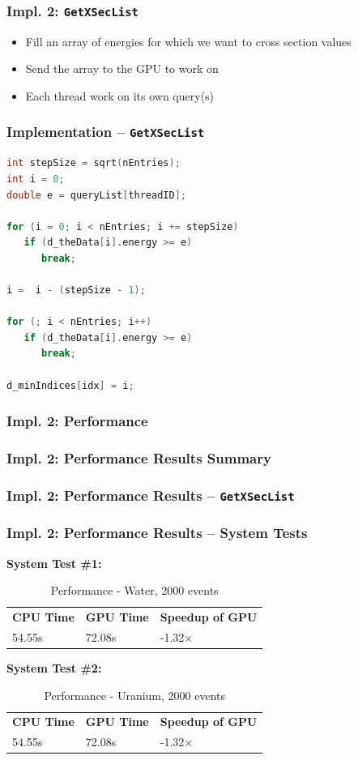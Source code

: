 \documentclass{beamer}
\begin{document}
\begin{frame}
\frametitle{Impl. 2: \texttt{GetXSecList}}
\begin{itemize}
\item Fill an array of energies for which we want to cross section values
\item Send the array to the GPU to work on
\item Each thread work on its own query(s)
\end{itemize}
\end{frame}

\begin{frame}[fragile]
\frametitle{Implementation -- \texttt{GetXSecList}}
\begin{lstlisting}[language=C++,basicstyle=\ttfamily,keywordstyle=\color{red}]
int stepSize = sqrt(nEntries);
int i = 0;
double e = queryList[threadID];
    
for (i = 0; i < nEntries; i += stepSize) 
   if (d_theData[i].energy >= e) 
      break;
   
i =  i - (stepSize - 1); 

for (; i < nEntries; i++) 
   if (d_theData[i].energy >= e) 
      break;
   
d_minIndices[idx] = i;
\end{lstlisting}
\end{frame}

\subsubsection{Impl. 2: Performance}
\begin{frame}
\frametitle{Impl. 2: Performance Results Summary}
\end{frame}

\begin{frame}
\frametitle{Impl. 2: Performance Results -- \texttt{GetXSecList}}
\end{frame}


\begin{frame}
\frametitle{Impl. 2: Performance Results -- System Tests}
\textbf{System Test \#1:}\\
\begin{table}
		\caption{Performance - Water, 2000 events}
		\begin{tabular}{lll}
		\bf CPU Time&\bf  GPU Time&\bf Speedup of GPU\\
		54.55s&72.08s&-1.32$\times$\\
		\end{tabular}
\end{table}
\textbf{System Test \#2:}\\
\begin{table}
		\caption{Performance - Uranium, 2000 events}
		\begin{tabular}{lll}
		\bf CPU Time&\bf  GPU Time&\bf Speedup of GPU\\
		54.55s&72.08s&-1.32$\times$\\
		\end{tabular}
\end{table}
\end{frame}
\end{document}
